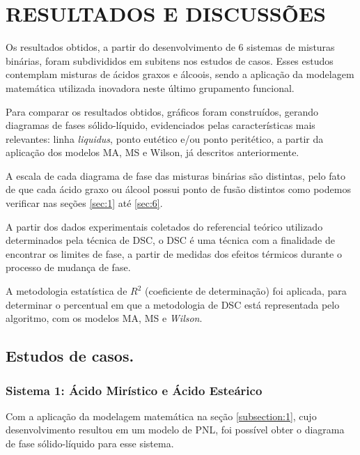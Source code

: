 \chapter{RESULTADOS E DISCUSSÕES}

Os resultados obtidos, a partir do desenvolvimento de  6 sistemas de misturas binárias, foram subdivididos em subitens nos estudos de casos. Esses estudos contemplam misturas de ácidos graxos e álcoois, sendo a aplicação da modelagem matemática utilizada inovadora neste último grupamento funcional.

Para comparar os resultados obtidos,  gráficos foram construídos, gerando diagramas de fases sólido-líquido, evidenciados pelas características mais relevantes: linha \textit{liquidus}, ponto eutético e/ou ponto peritético, a partir da aplicação dos  modelos MA, MS e Wilson, já descritos anteriormente.

A escala de cada diagrama de fase das misturas binárias são distintas, pelo fato de que cada ácido graxo ou álcool possui ponto de fusão distintos como podemos verificar nas seções \ref{sec:1} até \ref{sec:6}.

A partir dos dados experimentais coletados do referencial teórico utilizado determinados pela técnica de DSC, o DSC é uma técnica com a finalidade de encontrar os limites de fase, a partir de medidas dos efeitos térmicos durante o processo de mudança de fase.

A metodologia estatística de $R^2$ (coeficiente de determinação) foi aplicada, para determinar o percentual em que a metodologia de DSC está representada pelo algoritmo, com os modelos MA, MS e \textit{Wilson}.

\section{Estudos de casos.}

\subsection{Sistema 1: Ácido Mirístico e Ácido Esteárico}\label{sistema1}
Com a aplicação da modelagem matemática na seção \ref{subsection:1}, cujo desenvolvimento resultou em um modelo de PNL, foi possível obter o diagrama de fase sólido-líquido para esse sistema.

